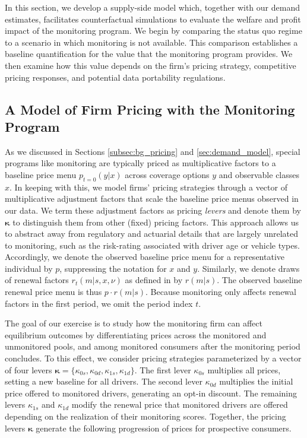 In this section, we develop a supply-side model which, together with our demand estimates, facilitates counterfactual simulations to evaluate the welfare and profit impact of the monitoring program. We begin by comparing the status quo regime to a scenario in which monitoring is not available. This comparison establishes a baseline quantification for the value that the monitoring program provides. We then examine how this value depends on the firm's pricing strategy, competitive pricing responses, and potential data portability regulations.

\subsection{A Model of Firm Pricing with the Monitoring Program}\label{subsec:pricing}

As we discussed in Sections \ref{subsec:bg_pricing} and \ref{sec:demand_model}, special programs like monitoring are typically priced as multiplicative factors to a baseline price menu $p_{t=0}(y|x)$ across coverage options $y$ and observable classes $x$. In keeping with this, we model firms' pricing strategies through a vector of multiplicative adjustment factors that scale the baseline price menus observed in our data. We term these adjustment factors as pricing \textit{levers} and denote them by $\boldsymbol{\kappa}$ to distinguish them from other (fixed) pricing factors. This approach allows us to abstract away from regulatory and actuarial details that are largely unrelated to monitoring, such as the risk-rating associated with driver age or vehicle types.
Accordingly, we denote the observed baseline price menu for a representative individual by $p$, suppressing the notation for $x$ and $y$.
Similarly, we denote draws of renewal factors $r_{t}(m|s,x,\nu)$ as defined in  by $r(m|s)$. The observed baseline renewal price menu is thus $p\cdot r(m|s)$. Because monitoring only affects renewal factors in the first period,
we omit the period index $t$.

The goal of our exercise is to study how the monitoring firm can affect equilibrium outcomes by differentiating prices across the monitored and unmonitored pools, and among monitored consumers after the monitoring period concludes. To this effect, we consider pricing strategies parameterized by a vector of four levers $\boldsymbol{\kappa} = \{\kappa_{0s}, \kappa_{0d},\kappa_{1s}, \kappa_{1d}\}$. The first lever $\kappa_{0s}$ multiplies all prices, setting a new baseline for all drivers. The second lever $\kappa_{0d}$ multiplies the initial price offered to monitored drivers, generating an opt-in discount. The remaining levers $\kappa_{1s}$ and $\kappa_{1d}$ modify the renewal price that monitored drivers are offered depending on the realization of their monitoring scores. Together, the pricing levers $\boldsymbol{\kappa}$ generate the following progression of prices for prospective consumers.

